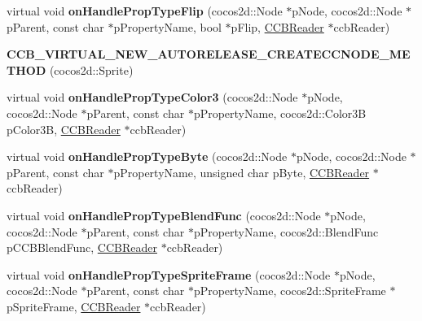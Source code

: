 \begin{DoxyCompactItemize}
\item 
\mbox{\label{classcocosbuilder_1_1SpriteLoader_afa743218a31052d79ab29cdf1d0431ca}} 
virtual void {\bfseries on\+Handle\+Prop\+Type\+Flip} (cocos2d\+::\+Node $\ast$p\+Node, cocos2d\+::\+Node $\ast$p\+Parent, const char $\ast$p\+Property\+Name, bool $\ast$p\+Flip, \hyperlink{classcocosbuilder_1_1CCBReader}{C\+C\+B\+Reader} $\ast$ccb\+Reader)
\item 
\mbox{\label{classcocosbuilder_1_1SpriteLoader_ac61c91ba9165bf9e9d8a9a86bd315f0f}} 
{\bfseries C\+C\+B\+\_\+\+V\+I\+R\+T\+U\+A\+L\+\_\+\+N\+E\+W\+\_\+\+A\+U\+T\+O\+R\+E\+L\+E\+A\+S\+E\+\_\+\+C\+R\+E\+A\+T\+E\+C\+C\+N\+O\+D\+E\+\_\+\+M\+E\+T\+H\+OD} (cocos2d\+::\+Sprite)
\item 
\mbox{\label{classcocosbuilder_1_1SpriteLoader_a3a45af101a0db008f2d24dcf6b6ee66c}} 
virtual void {\bfseries on\+Handle\+Prop\+Type\+Color3} (cocos2d\+::\+Node $\ast$p\+Node, cocos2d\+::\+Node $\ast$p\+Parent, const char $\ast$p\+Property\+Name, cocos2d\+::\+Color3B p\+Color3B, \hyperlink{classcocosbuilder_1_1CCBReader}{C\+C\+B\+Reader} $\ast$ccb\+Reader)
\item 
\mbox{\label{classcocosbuilder_1_1SpriteLoader_a7fb3e9b9172c2f1396e97951c0a2f8f3}} 
virtual void {\bfseries on\+Handle\+Prop\+Type\+Byte} (cocos2d\+::\+Node $\ast$p\+Node, cocos2d\+::\+Node $\ast$p\+Parent, const char $\ast$p\+Property\+Name, unsigned char p\+Byte, \hyperlink{classcocosbuilder_1_1CCBReader}{C\+C\+B\+Reader} $\ast$ccb\+Reader)
\item 
\mbox{\label{classcocosbuilder_1_1SpriteLoader_a3c6dea939a655ee315041aff1fe14ac6}} 
virtual void {\bfseries on\+Handle\+Prop\+Type\+Blend\+Func} (cocos2d\+::\+Node $\ast$p\+Node, cocos2d\+::\+Node $\ast$p\+Parent, const char $\ast$p\+Property\+Name, cocos2d\+::\+Blend\+Func p\+C\+C\+B\+Blend\+Func, \hyperlink{classcocosbuilder_1_1CCBReader}{C\+C\+B\+Reader} $\ast$ccb\+Reader)
\item 
\mbox{\label{classcocosbuilder_1_1SpriteLoader_af058cce49823dfc2482249ae42651670}} 
virtual void {\bfseries on\+Handle\+Prop\+Type\+Sprite\+Frame} (cocos2d\+::\+Node $\ast$p\+Node, cocos2d\+::\+Node $\ast$p\+Parent, const char $\ast$p\+Property\+Name, cocos2d\+::\+Sprite\+Frame $\ast$p\+Sprite\+Frame, \hyperlink{classcocosbuilder_1_1CCBReader}{C\+C\+B\+Reader} $\ast$ccb\+Reader)

\end{DoxyCompactItemize}
